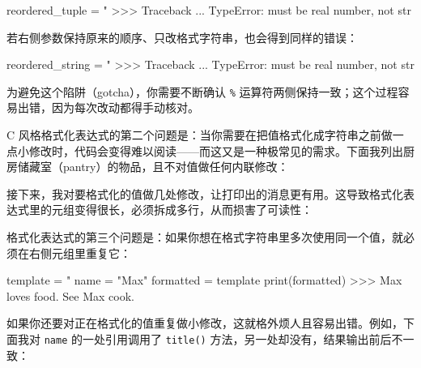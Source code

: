 \begin{codebox}[python]
reordered_tuple = "%
>>>
Traceback ...
TypeError: must be real number, not str
\end{codebox}

若右侧参数保持原来的顺序、只改格式字符串，也会得到同样的错误：

\begin{codebox}[python]
reordered_string = "%
>>>
Traceback ...
TypeError: must be real number, not str
\end{codebox}

为避免这个陷阱（gotcha），你需要不断确认 \texttt{\%} 运算符两侧保持一致；这个过程容易出错，因为每次改动都得手动核对。

C 风格格式化表达式的第二个问题是：当你需要在把值格式化成字符串之前做一点小修改时，代码会变得难以阅读——而这又是一种极常见的需求。下面我列出厨房储藏室（pantry）的物品，且不对值做任何内联修改：


接下来，我对要格式化的值做几处修改，让打印出的消息更有用。这导致格式化表达式里的元组变得很长，必须拆成多行，从而损害了可读性：


格式化表达式的第三个问题是：如果你想在格式字符串里多次使用同一个值，就必须在右侧元组里重复它：

\begin{codebox}[python]
template = "%
name = "Max"
formatted = template %
print(formatted)
>>>
Max loves food. See Max cook.
\end{codebox}

如果你还要对正在格式化的值重复做小修改，这就格外烦人且容易出错。例如，下面我对 \texttt{name} 的一处引用调用了 \texttt{title()} 方法，另一处却没有，结果输出前后不一致：

